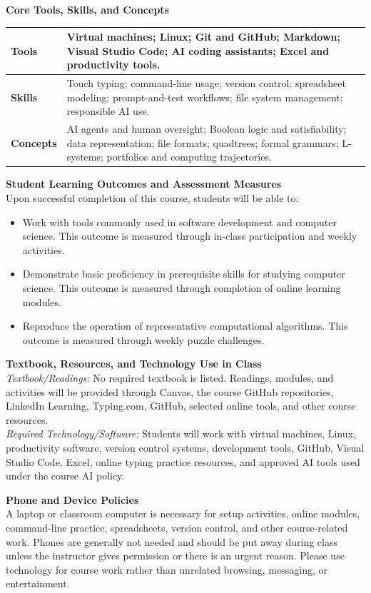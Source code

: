 \documentclass[11pt,letterpaper]{article}
\newcommand{\lefthead}[2]{\noindent\textbf{#1}\hfill\\[#2]}
\newcommand{\blankline}{\par\vspace{0.3cm}}
\begin{document}
\lefthead{Core Tools, Skills, and Concepts}{0.3cm}
\begin{center}
\begin{tabularx}{0.95\textwidth}{|>{\bfseries}l|X|}
\hline
Tools & Virtual machines; Linux; Git and GitHub; Markdown; Visual Studio Code; AI coding assistants; Excel and productivity tools. \\ \hline
Skills & Touch typing; command-line usage; version control; spreadsheet modeling; prompt-and-test workflows; file system management; responsible AI use. \\ \hline
Concepts & AI agents and human oversight; Boolean logic and satisfiability; data representation; file formats; quadtrees; formal grammars; L-systems; portfolios and computing trajectories. \\ \hline
\end{tabularx}
\end{center}
\blankline

\lefthead{Student Learning Outcomes and Assessment Measures}{0.3cm}
Upon successful completion of this course, students will be able to:
\begin{itemize}
    \item Work with tools commonly used in software development and computer science. This outcome is measured through in-class participation and weekly activities.
    \item Demonstrate basic proficiency in prerequisite skills for studying computer science. This outcome is measured through completion of online learning modules.
    \item Reproduce the operation of representative computational algorithms. This outcome is measured through weekly puzzle challenges.
\end{itemize}

\lefthead{Textbook, Resources, and Technology Use in Class}{0.3cm}
\noindent \emph{Textbook/Readings:} No required textbook is listed. Readings, modules, and activities will be provided through Canvas, the course GitHub repositories, LinkedIn Learning, Typing.com, GitHub, selected online tools, and other course resources.\\
\noindent \emph{Required Technology/Software:} Students will work with virtual machines, Linux, productivity software, version control systems, development tools, GitHub, Visual Studio Code, Excel, online typing practice resources, and approved AI tools used under the course AI policy.
\blankline

\lefthead{Phone and Device Policies}{0.3cm}
A laptop or classroom computer is necessary for setup activities, online modules, command-line practice, spreadsheets, version control, and other course-related work. Phones are generally not needed and should be put away during class unless the instructor gives permission or there is an urgent reason. Please use technology for course work rather than unrelated browsing, messaging, or entertainment.
\blankline
\end{document}
